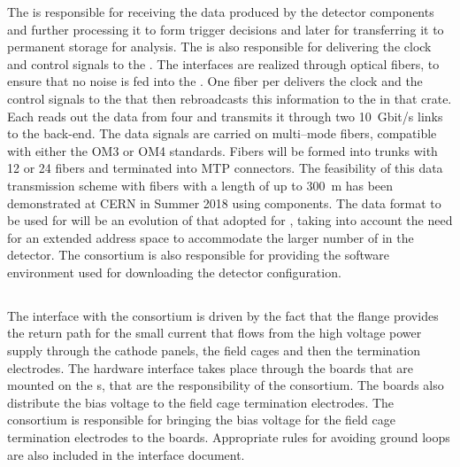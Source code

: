 The  is responsible for receiving the data produced by the
 detector components and further processing it to
form trigger decisions and later for transferring it to 
permanent storage for analysis. The 
 is also responsible for delivering the clock and control
signals to the . The interfaces are realized 
through optical fibers, to ensure that no noise is fed into
the . One fiber per  delivers the
clock and the control signals to the  that then
rebroadcasts this information to the  in that 
crate. Each  reads out the data from four 
and transmits it through two 10~Gbit/s links to the  back-end.
The data signals are carried on multi--mode fibers, compatible with 
either the OM3 or OM4 standards. Fibers will be formed into trunks with 
12 or 24 fibers and terminated into MTP connectors. The feasibility
of this data transmission scheme with fibers with a length of up
to 300~m has been demonstrated at CERN in Summer 2018 using 
 components. The data format to be used for 
 will be an evolution of that adopted for
, taking into account the need for an 
extended address space to accommodate the larger number of
 in the detector. The  consortium
is also responsible for providing the software environment
used for downloading the detector configuration.

\subsection{}
\label{sec:fdsp-tpcelec-interfaces-hv}

The interface with the  consortium
is driven by the fact that the  flange provides the return path for
the small current that flows from the high voltage power 
supply through the cathode panels, the field cages and then
the termination electrodes. The hardware interface takes place through
the  boards that are mounted on the s, that
are  the responsibility of the  consortium. The
 boards also distribute the bias voltage to the field
cage termination electrodes. The  consortium
is responsible for bringing the bias voltage for the field
cage termination electrodes to the  boards. Appropriate
rules for avoiding ground loops are also included in the 
interface document.

